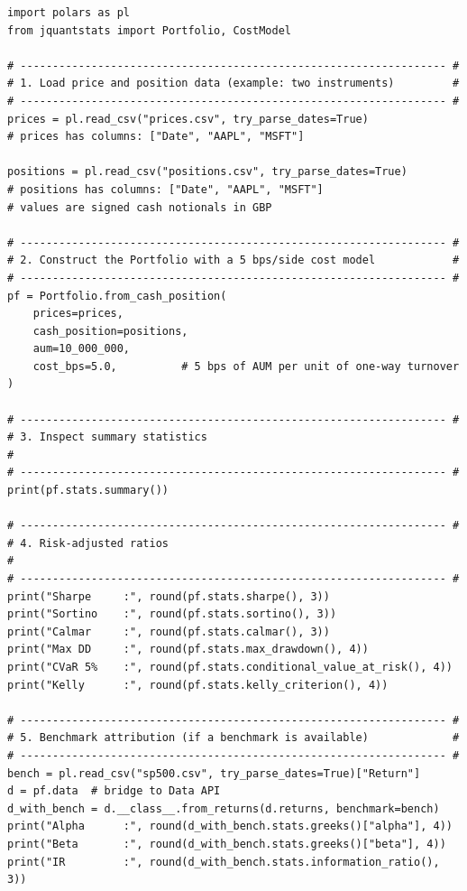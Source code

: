 \documentclass[11pt,a4paper]{article}
\begin{document}
\begin{lstlisting}[caption={Complete usage example.}]
import polars as pl
from jquantstats import Portfolio, CostModel

# ------------------------------------------------------------------ #
# 1. Load price and position data (example: two instruments)         #
# ------------------------------------------------------------------ #
prices = pl.read_csv("prices.csv", try_parse_dates=True)
# prices has columns: ["Date", "AAPL", "MSFT"]

positions = pl.read_csv("positions.csv", try_parse_dates=True)
# positions has columns: ["Date", "AAPL", "MSFT"]
# values are signed cash notionals in GBP

# ------------------------------------------------------------------ #
# 2. Construct the Portfolio with a 5 bps/side cost model            #
# ------------------------------------------------------------------ #
pf = Portfolio.from_cash_position(
    prices=prices,
    cash_position=positions,
    aum=10_000_000,
    cost_bps=5.0,          # 5 bps of AUM per unit of one-way turnover
)

# ------------------------------------------------------------------ #
# 3. Inspect summary statistics                                       #
# ------------------------------------------------------------------ #
print(pf.stats.summary())

# ------------------------------------------------------------------ #
# 4. Risk-adjusted ratios                                             #
# ------------------------------------------------------------------ #
print("Sharpe     :", round(pf.stats.sharpe(), 3))
print("Sortino    :", round(pf.stats.sortino(), 3))
print("Calmar     :", round(pf.stats.calmar(), 3))
print("Max DD     :", round(pf.stats.max_drawdown(), 4))
print("CVaR 5%    :", round(pf.stats.conditional_value_at_risk(), 4))
print("Kelly      :", round(pf.stats.kelly_criterion(), 4))

# ------------------------------------------------------------------ #
# 5. Benchmark attribution (if a benchmark is available)             #
# ------------------------------------------------------------------ #
bench = pl.read_csv("sp500.csv", try_parse_dates=True)["Return"]
d = pf.data  # bridge to Data API
d_with_bench = d.__class__.from_returns(d.returns, benchmark=bench)
print("Alpha      :", round(d_with_bench.stats.greeks()["alpha"], 4))
print("Beta       :", round(d_with_bench.stats.greeks()["beta"], 4))
print("IR         :", round(d_with_bench.stats.information_ratio(), 3))


\end{lstlisting}
\end{document}
